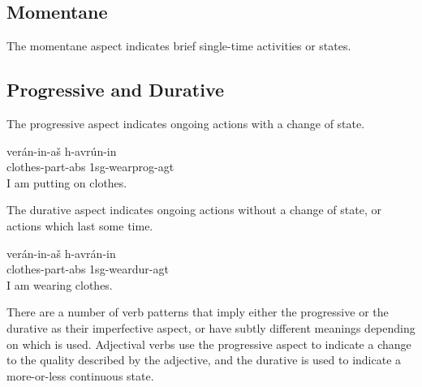 \documentclass[grammar]{subfiles}
\begin{document}
\subsection{Momentane}
\label{vp:ssec_momentane}

The momentane aspect indicates brief single-time activities or states. 


\subsection{Progressive and Durative}
\label{vp:ssec_progressive_durative}

The progressive aspect indicates ongoing actions with a change of state.  

\begin{exe}
  \ex\label{ex:vm_putting_on_clothes} 
  \gll verán-in-aš h-avrún-in\\
  clothes-\acs{part}-\acs{abs} \acs{1sg}-wear\bs\acs{prog}-\acs{agt}\\
  \glt I am putting on clothes.
\end{exe}

The durative aspect indicates ongoing actions without a change of state, or
actions which last some time.

\begin{exe}
  \ex\label{ex:vm_wearing_clothes} 
  \gll verán-in-aš h-avrán-in\\
  clothes-\acs{part}-\acs{abs} \acs{1sg}-wear\bs\acs{dur}-\acs{agt}\\
  \glt I am wearing clothes.
\end{exe}

There are a number of verb patterns that imply either the progressive or the
durative as their imperfective aspect, or have subtly different meanings
depending on which is used.  Adjectival verbs use the progressive aspect to
indicate a change to the quality described by the adjective, and the durative
is used to indicate a more-or-less continuous state. 


\end{document}
